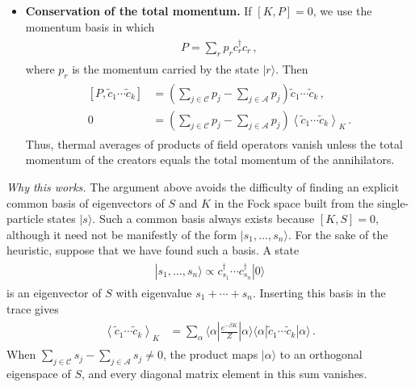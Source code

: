 \documentclass[../QFT_main.tex]{subfiles}
\begin{document}
\begin{mytheorem}
\begin{itemize}
    \item \textbf{Conservation of the total momentum.}
    If $[K,P]=0$, we use the momentum basis in which
    {\small\begin{align}\begin{aligned}
        P=\sum_r p_r c_r^\dagger c_r\,,
    \end{aligned}\end{align}}
    where $p_r$ is the momentum carried by the state $|r\rangle$.
    Then
    {\small\begin{align}\begin{aligned}
        [P,\widetilde c_1\cdots\widetilde c_k]
        &=
        \left(\sum_{j\in\mathcal C}p_j-\sum_{j\in\mathcal A}p_j\right)
        \widetilde c_1\cdots\widetilde c_k\,,
        \\
        0
        &=
        \left(\sum_{j\in\mathcal C}p_j-\sum_{j\in\mathcal A}p_j\right)
        \left\langle\widetilde c_1\cdots\widetilde c_k\right\rangle_K\,.
    \end{aligned}\end{align}}
    Thus, thermal averages of products of field operators vanish unless the total momentum of the creators equals the total momentum of the annihilators.
\end{itemize}

\emph{Why this works.}
The argument above avoids the difficulty of finding an explicit common basis of eigenvectors of $S$ and $K$ in the Fock space built from the single-particle states $|s\rangle$.
Such a common basis always exists because $[K,S]=0$, although it need not be manifestly of the form $|s_1,\ldots,s_n\rangle$.
For the sake of the heuristic, suppose that we have found such a basis.
A state
{\small\begin{align}\begin{aligned}
    |s_1,\ldots,s_n\rangle
    \propto c_{s_1}^\dagger\cdots c_{s_n}^\dagger|0\rangle
\end{aligned}\end{align}}
is an eigenvector of $S$ with eigenvalue $s_1+\cdots+s_n$.
Inserting this basis in the trace gives
{\small\begin{align}\begin{aligned}
    \left\langle\widetilde c_1\cdots\widetilde c_k\right\rangle_K
    &=
    \sum_\alpha
    \langle\alpha|\tfrac{e^{-\beta K}}{Z}|\alpha\rangle
    \langle\alpha|\widetilde c_1\cdots\widetilde c_k|\alpha\rangle\,.
\end{aligned}\end{align}}
When $\sum_{j\in\mathcal C}s_j-\sum_{j\in\mathcal A}s_j\neq0$, the product maps $|\alpha\rangle$ to an orthogonal eigenspace of $S$, and every diagonal matrix element in this sum vanishes.
\end{mytheorem}
\end{document}
